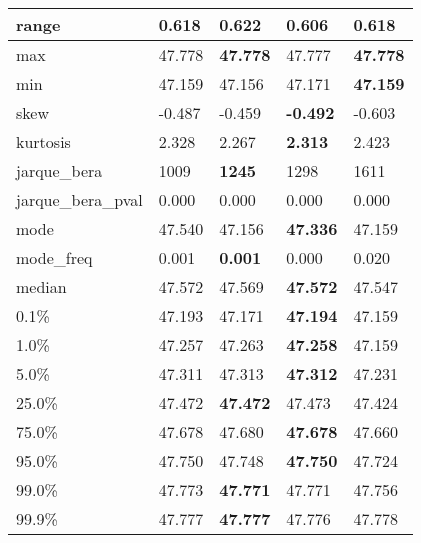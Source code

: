 \begin{table}[H]
\begin{tabular}{|l|m{10em}|m{10em}|m{10em}|m{10em}|}
\hline range & 0.618 & 0.622 & \cellcolor[rgb]{0.9, 0.54, 0.52} 0.606 & \bfseries 0.618 \\
\hline max & 47.778 & \bfseries 47.778 & \cellcolor[rgb]{0.9, 0.54, 0.52} 47.777 & \bfseries 47.778 \\
\hline min & 47.159 & 47.156 & \cellcolor[rgb]{0.9, 0.54, 0.52} 47.171 & \bfseries 47.159 \\
\hline skew & -0.487 & -0.459 & \bfseries -0.492 & \cellcolor[rgb]{0.9, 0.54, 0.52} -0.603 \\
\hline kurtosis & 2.328 & 2.267 & \bfseries 2.313 & \cellcolor[rgb]{0.9, 0.54, 0.52} 2.423 \\
\hline jarque\_bera & 1009 & \bfseries 1245 & 1298 & \cellcolor[rgb]{0.9, 0.54, 0.52} 1611 \\
\hline jarque\_bera\_pval & 0.000 & 0.000 & 0.000 & 0.000 \\
\hline mode & 47.540 & \cellcolor[rgb]{0.9, 0.54, 0.52} 47.156 & \bfseries 47.336 & 47.159 \\
\hline mode\_freq & 0.001 & \bfseries 0.001 & 0.000 & \cellcolor[rgb]{0.9, 0.54, 0.52} 0.020 \\
\hline median & 47.572 & 47.569 & \bfseries 47.572 & \cellcolor[rgb]{0.9, 0.54, 0.52} 47.547 \\
\hline 0.1\% & 47.193 & 47.171 & \bfseries 47.194 & \cellcolor[rgb]{0.9, 0.54, 0.52} 47.159 \\
\hline 1.0\% & 47.257 & 47.263 & \bfseries 47.258 & \cellcolor[rgb]{0.9, 0.54, 0.52} 47.159 \\
\hline 5.0\% & 47.311 & 47.313 & \bfseries 47.312 & \cellcolor[rgb]{0.9, 0.54, 0.52} 47.231 \\
\hline 25.0\% & 47.472 & \bfseries 47.472 & 47.473 & \cellcolor[rgb]{0.9, 0.54, 0.52} 47.424 \\
\hline 75.0\% & 47.678 & 47.680 & \bfseries 47.678 & \cellcolor[rgb]{0.9, 0.54, 0.52} 47.660 \\
\hline 95.0\% & 47.750 & 47.748 & \bfseries 47.750 & \cellcolor[rgb]{0.9, 0.54, 0.52} 47.724 \\
\hline 99.0\% & 47.773 & \bfseries 47.771 & 47.771 & \cellcolor[rgb]{0.9, 0.54, 0.52} 47.756 \\
\hline 99.9\% & 47.777 & \bfseries 47.777 & \cellcolor[rgb]{0.9, 0.54, 0.52} 47.776 & 47.778 \\
\hline
\end{tabular}
\end{table}
